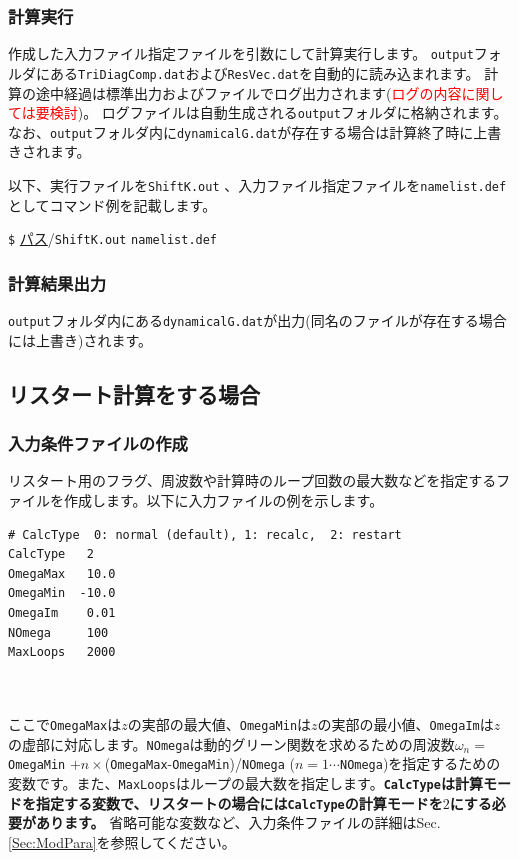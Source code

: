 \documentclass[12pt,titlepage]{jarticle}
\begin{document}
\subsubsection*{計算実行}
作成した入力ファイル指定ファイルを引数にして計算実行します。
\verb|output|フォルダにある\verb|TriDiagComp.dat|および\verb|ResVec.dat|を自動的に読み込まれます。
計算の途中経過は標準出力およびファイルでログ出力されます(\textcolor{red}{ログの内容に関しては要検討})。
ログファイルは自動生成される\verb|output|フォルダに格納されます。
なお、\verb|output|フォルダ内に\verb|dynamicalG.dat|が存在する場合は計算終了時に上書きされます。

以下、実行ファイルを\verb|ShiftK.out| 、入力ファイル指定ファイルを\verb|namelist.def|としてコマンド例を記載します。

\verb|$| \underline{パス}/\verb|ShiftK.out|  \verb|namelist.def|

\subsubsection*{計算結果出力}
\verb|output|フォルダ内にある\verb|dynamicalG.dat|が出力(同名のファイルが存在する場合には上書き)されます。

\subsection{リスタート計算をする場合}
\subsubsection*{入力条件ファイルの作成}
リスタート用のフラグ、周波数や計算時のループ回数の最大数などを指定するファイルを作成します。以下に入力ファイルの例を示します。\\
\begin{minipage}{12.5cm}
\begin{screen}
\begin{verbatim}
# CalcType  0: normal (default), 1: recalc,  2: restart
CalcType   2 
OmegaMax   10.0
OmegaMin  -10.0
OmegaIm    0.01
NOmega     100  
MaxLoops   2000
\end{verbatim}
\end{screen}
\end{minipage}
\\ \\
ここで\verb|OmegaMax|は$z$の実部の最大値、\verb|OmegaMin|は$z$の実部の最小値、\verb|OmegaIm|は$z$の虚部に対応します。\verb|NOmega|は動的グリーン関数を求めるための周波数$\omega_n = $ \verb|OmegaMin| $+n\times$(\verb|OmegaMax|-\verb|OmegaMin|)/\verb|NOmega| ($n=1\cdots$\verb|NOmega|)を指定するための変数です。また、\verb|MaxLoops|はループの最大数を指定します。{\bf \verb|CalcType|は計算モードを指定する変数で、リスタートの場合には\verb|CalcType|の計算モードを$2$にする必要があります。}
省略可能な変数など、入力条件ファイルの詳細はSec. \ref{Sec:ModPara}を参照してください。
\end{document}

